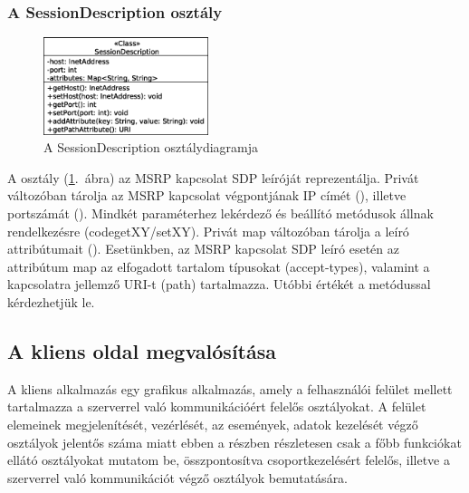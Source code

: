 \subsubsection*{A SessionDescription osztály}
\label{sec:msrp_sdp}

\begin{figure}
  \vspace{-15pt}
  \begin{center}
    \includegraphics[width=0.43\textwidth]{img/class_diagrams/SessionDescription.eps}
  \end{center}
  \vspace{-15pt}
  \captionsetup{font=scriptsize}
  \caption{A SessionDescription osztálydiagramja}
   \label{fig:class_sdp}
  \vspace{-10pt}
\end{figure}

A  osztály (\ref{fig:class_sdp}.~ábra) az MSRP kapcsolat SDP leíróját reprezentálja. Privát változóban tárolja az MSRP kapcsolat végpontjának IP címét (), illetve portszámát (). Mindkét paraméterhez lekérdező és beállító metódusok állnak rendelkezésre (code{getXY/setXY}). Privát map változóban tárolja a leíró attribútumait (). Esetünkben, az MSRP kapcsolat SDP leíró esetén az attribútum map az elfogadott tartalom típusokat (accept-types), valamint a kapcsolatra jellemző URI-t (path) tartalmazza. Utóbbi értékét a  metódussal kérdezhetjük le.

\subsection{A kliens oldal megvalósítása}

A kliens alkalmazás egy grafikus alkalmazás, amely a felhasználói felület mellett tartalmazza a szerverrel való kommunikációért felelős osztályokat. A felület elemeinek megjelenítését, vezérlését, az események, adatok kezelését végző osztályok jelentős száma miatt ebben a részben részletesen csak a főbb funkciókat ellátó osztályokat mutatom be, összpontosítva csoportkezelésért felelős, illetve a szerverrel való kommunikációt végző osztályok bemutatására.

